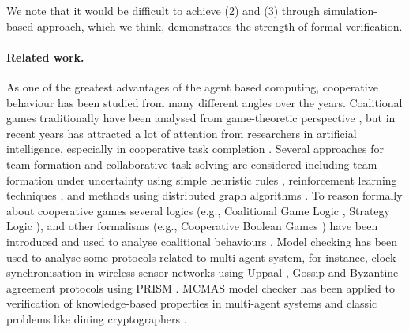 \documentclass{llncs}
\newcommand{\comment}[1]{\marginpar{\footnotesize \color{red} \textsf{#1}}}
\begin{document}
We note that it would be difficult to achieve (2) and (3) through simulation-based approach, which we think, demonstrates the strength of formal verification. 


\paragraph{Related work.} As one of the greatest advantages of the agent based computing, cooperative behaviour has been studied from many different angles over the years. Coalitional games traditionally have been analysed from game-theoretic perspective \cite{osborne1994course}, but in recent years has attracted a lot of attention from researchers in artificial intelligence, especially in cooperative task completion \cite{shehory1998methods}. Several approaches for team formation and collaborative task solving are considered including team formation under uncertainty using simple heuristic rules \cite{kraus2003coalition}, reinforcement learning techniques \cite{abdallah2004organization}, and methods using distributed graph algorithms \cite{manisterski2006forming}. To reason formally about cooperative games several logics (e.g., Coalitional Game Logic \cite{agotnes2009reasoning}, Strategy Logic \cite{chatterjee2007strategy}), and other formalisms (e.g., Cooperative Boolean Games \cite{dunne2008cooperative}) have been introduced and used to analyse coalitional behaviours \cite{bonzon2007efficient}. Model checking has been used to analyse some protocols related to multi-agent system, for instance, clock synchronisation in wireless sensor networks using Uppaal \cite{heidarian2009analysis}, Gossip \cite{KNP08d} and Byzantine agreement protocols \cite{KN02} using PRISM \cite{KNP11}. MCMAS model checker has been applied to verification of knowledge-based properties in multi-agent systems and classic problems like dining cryptographers \cite{lomuscio2006mcmas}.



\end{document}
